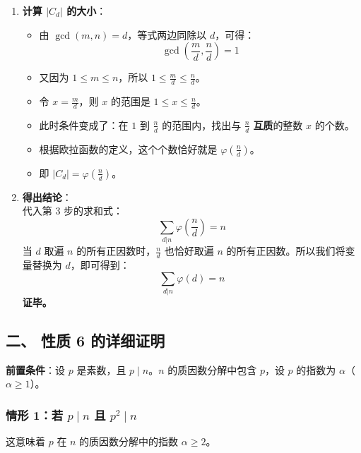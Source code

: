 \documentclass{article}
\begin{document}
\begin{enumerate}
    \item \textbf{计算 \(|C_d|\) 的大小}：\\
    \begin{itemize}
        \item 由 \(\gcd(m, n) = d\)，等式两边同除以 \(d\)，可得：
        \[
 \gcd\left(\frac{m}{d}, \frac{n}{d}\right) = 1 
\]
        \item 又因为 \(1 \le m \le n\)，所以 \(1 \le \frac{m}{d} \le \frac{n}{d}\)。
        \item 令 \(x = \frac{m}{d}\)，则 \(x\) 的范围是 \(1 \le x \le \frac{n}{d}\)。
        \item 此时条件变成了：在 \(1\) 到 \(\frac{n}{d}\) 的范围内，找出与 \(\frac{n}{d}\) \textbf{互质}的整数 \(x\) 的个数。
        \item 根据欧拉函数的定义，这个个数恰好就是 \(\varphi\left(\frac{n}{d}\right)\)。
        \item 即 \(|C_d| = \varphi\left(\frac{n}{d}\right)\)。
    \end{itemize}

    \item \textbf{得出结论}：\\
    代入第 3 步的求和式：
    \[
 \sum_{d|n} \varphi\left(\frac{n}{d}\right) = n 
\]
    当 \(d\) 取遍 \(n\) 的所有正因数时，\(\frac{n}{d}\) 也恰好取遍 \(n\) 的所有正因数。所以我们将变量替换为 \(d\)，即可得到：
    \[
 \sum_{d|n} \varphi(d) = n 
\]
    \textbf{证毕。}
\end{enumerate}

\subsection*{二、 性质 6 的详细证明}

\textbf{前置条件}：设 \(p\) 是素数，且 \(p \mid n\)。\(n\) 的质因数分解中包含 \(p\)，设 \(p\) 的指数为 \(\alpha\)（\(\alpha \ge 1\)）。

\subsubsection*{情形 1：若 \(p \mid n\) 且 \(p^2 \mid n\)}
这意味着 \(p\) 在 \(n\) 的质因数分解中的指数 \(\alpha \ge 2\)。
\end{document}
